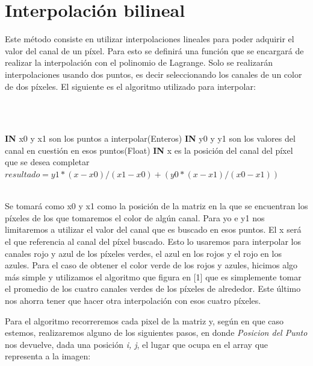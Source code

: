 \documentclass[10pt, a4paper]{article}
\begin{document}
\section{Interpolaci\'on bilineal}

Este m\'etodo consiste en utilizar interpolaciones lineales para poder adquirir el valor del canal de un p\'ixel. Para esto se definir\'a una funci\'on que se encargar\'a de realizar la interpolaci\'on con el polinomio de Lagrange. Solo se realizar\'an interpolaciones usando dos puntos, es decir seleccionando los canales de un color de dos p\'ixeles. El siguiente es el algoritmo utilizado para interpolar:

\ \\
\begin{algorithm}[H]
\ \\
\textbf{IN} x0 y x1 son los puntos a interpolar(Enteros)\;
\textbf{IN} y0 y y1 son los valores del canal en cuesti\'on en esos puntos(Float)\;
\textbf{IN} x es la posici\'on del canal del p\'ixel que se desea completar\;
$resultado=y1*(x-x0)/(x1-x0)+(y0*(x-x1)/(x0-x1))$\;
\caption{Algoritmo de interpolaci\'on lineal}
\end{algorithm} 
\ \\

Se tomar\'a como x0 y x1 como la posici\'on de la matriz en la que se encuentran los p\'ixeles de los que tomaremos el color de alg\'un canal. Para yo e y1 nos limitaremos a utilizar el valor del canal que es buscado en esos puntos. El x ser\'a el que referencia al canal del p\'ixel buscado. Esto lo usaremos para interpolar los canales rojo y azul de los p\'ixeles verdes, el azul en los rojos y el rojo en los azules. Para el caso de obtener el color verde de los rojos y azules, hicimos algo m\'as simple y utilizamos el algoritmo que figura en [1] que es simplemente tomar el promedio de los cuatro canales verdes de los p\'ixeles de alrededor. Este \'ultimo nos ahorra tener que hacer otra interpolaci\'on con esos cuatro p\'ixeles. 

Para el algoritmo recorreremos cada pixel de la matriz y, seg\'un en que caso estemos, realizaremos alguno de los siguientes pasos, en donde \textit{Posicion del Punto} nos devuelve, dada una posici\'on \textit{i, j}, el lugar que ocupa en el array que representa a la imagen: 
\end{document}
